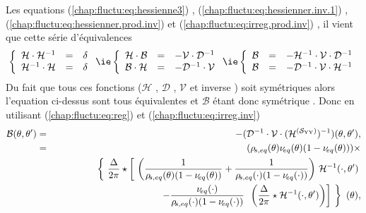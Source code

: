 \medskip

Les equations (\ref{chap:fluctu:eq:hessienne3}) , (\ref{chap:fluctu:eq:hessienner.inv.1}) , (\ref{chap:fluctu:eq:hessienner.prod.inv}) et (\ref{chap:fluctu:eq:irreg.prod.inv}) , il vient que cette série d'équivalences
\begin{eqnarray*}
	\left \{\begin{array}{rcl} \mathcal{H}\cdot\mathcal{H}^{-1} & =& \delta \\  \mathcal{H}^{-1}\cdot \mathcal{H}& =& \delta  \end{array} \right.  \mbox{\ie}	 \left \{\begin{array}{rcl} \mathcal{H}\cdot\mathcal{B} & =& - \mathcal{V}\cdot\mathcal{D}^{-1} \\  \mathcal{B}\cdot\mathcal{H} & =& - \mathcal{D}^{-1}\cdot\mathcal{V}  \end{array} \right. \mbox{\ie} \left \{\begin{array}{rcl} \mathcal{B} & =& - \mathcal{H}^{-1}\cdot\mathcal{V}\cdot \mathcal{D}^{-1}  \\  \mathcal{B} & =& - \mathcal{D}^{-1}\cdot\mathcal{V}\cdot \mathcal{H}^{-1}  \end{array} \right.	
\end{eqnarray*}
Du fait que tous ces fonctions ($\mathcal{H}$ , $\mathcal{D}$ , $\mathcal{V}$ et inverse ) soit symétriques alors l'equation ci-dessus sont tous équivalentes et $\mathcal{B}$ étant donc symétrique .
Donc en utilisant (\ref{chap:fluctu:eq:reg}) et (\ref{chap:fluctu:eq:irreg.inv}) 
\begin{eqnarray}
	\mathcal{B}(\theta , \theta ' )  & = & - (\mathcal{D}^{-1}\cdot\mathcal{V}\cdot (\mathcal{H}^{(\mathcal{S}_{\mathrm{YY}})})^{-1})(\theta , \theta') 	, \label{chap:fluctu:eq:B.1}\\
	& = & 	 (\rho_{\! s , eq}(\theta) \nu_{\! eq}(\theta) (1 -  \nu_{\! eq}(\theta) )) \times  \notag\\
	&&  ~~~~~~~~~~~~~\left \{  \frac{\Delta}{2\pi} \star  \left [ \left (  \frac{1}{\rho_{\! s, eq}(\theta)  (1 - \nu_{\! eq}(\theta)  )} +  \frac{1}{\rho_{\! s, eq}(\cdot) (1 - \nu_{\! eq} (\cdot )  )}\right )  \, \mathcal{H}^{-1}( \cdot , \theta ' )   \right. \right .\notag\\
	 &&  ~~~~~~~~~~~~~~~~~~~~~~~~~\left . \left .   -  \frac{\nu_{\! eq}(\cdot)}{\rho_{\! s, eq}(\cdot) ( 1 - \nu_{\! eq}(\cdot) )}  \, \left ( \frac{\Delta}{2\pi} \star \mathcal{H}^{-1}( \cdot , \theta ' )   \right )  \right ] \right \} (\theta)   \notag,
\end{eqnarray}
